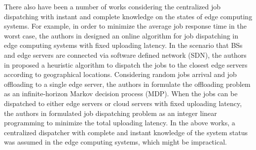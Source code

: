 There also have been a number of works considering the centralized job dispatching with instant and complete knowledge on the states of edge computing systems.
For example, in order to minimize the average job response time in the worst case, the authors in \cite{tan-online} designed an online algorithm for job dispatching in edge computing systems with fixed uploading latency.
In the scenario that BSs and edge servers are connected via software defined network (SDN), the authors in \cite{IOTJ18-FanQ} proposed a heuristic algorithm to dispatch the jobs to the closest edge servers according to geographical locations.
Considering random jobs arrival and job offloading to a single edge server, the authors in \cite{mdp-globecom,mdp-tvt} formulate the offloading problem as an infinite-horizon Markov decision process (MDP).
When the jobs can be dispatched to either edge servers or cloud servers with fixed uploading latency, the authors in \cite{MASS18-MengZ} formulated job dispatching problem as an integer linear programming to minimize the total uploading latency.
In the above works, a centralized dispatcher with complete and instant knowledge of the system status was assumed in the edge computing systems, which might be impractical.



